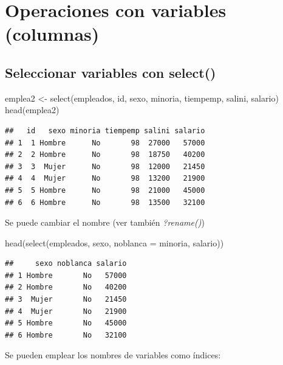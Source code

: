 \documentclass[
]{book}
\newenvironment{Shaded}{\begin{snugshade}}{\end{snugshade}}
\newcommand{\AttributeTok}[1]{\textcolor[rgb]{0.77,0.63,0.00}{#1}}
\newcommand{\FunctionTok}[1]{\textcolor[rgb]{0.00,0.00,0.00}{#1}}
\newcommand{\NormalTok}[1]{#1}
\newcommand{\OtherTok}[1]{\textcolor[rgb]{0.56,0.35,0.01}{#1}}
\theoremstyle{break}
\theoremstyle{nonumberplain}
\begin{document}
\hypertarget{operaciones-con-variables-columnas}{%
\section{Operaciones con variables (columnas)}\label{operaciones-con-variables-columnas}}

\hypertarget{seleccionar-variables-con-select}{%
\subsection{\texorpdfstring{Seleccionar variables con \textbf{select()}}{Seleccionar variables con select()}}\label{seleccionar-variables-con-select}}

\begin{Shaded}
\begin{Highlighting}[]
\NormalTok{emplea2 }\OtherTok{\textless{}{-}} \FunctionTok{select}\NormalTok{(empleados, id, sexo, minoria, tiempemp, salini, salario)}
\FunctionTok{head}\NormalTok{(emplea2)}
\end{Highlighting}
\end{Shaded}

\begin{verbatim}
##   id   sexo minoria tiempemp salini salario
## 1  1 Hombre      No       98  27000   57000
## 2  2 Hombre      No       98  18750   40200
## 3  3  Mujer      No       98  12000   21450
## 4  4  Mujer      No       98  13200   21900
## 5  5 Hombre      No       98  21000   45000
## 6  6 Hombre      No       98  13500   32100
\end{verbatim}

Se puede cambiar el nombre (ver también \emph{?rename()})

\begin{Shaded}
\begin{Highlighting}[]
\FunctionTok{head}\NormalTok{(}\FunctionTok{select}\NormalTok{(empleados, sexo, }\AttributeTok{noblanca =}\NormalTok{ minoria, salario))}
\end{Highlighting}
\end{Shaded}

\begin{verbatim}
##     sexo noblanca salario
## 1 Hombre       No   57000
## 2 Hombre       No   40200
## 3  Mujer       No   21450
## 4  Mujer       No   21900
## 5 Hombre       No   45000
## 6 Hombre       No   32100
\end{verbatim}

Se pueden emplear los nombres de variables como índices:
\end{document}
